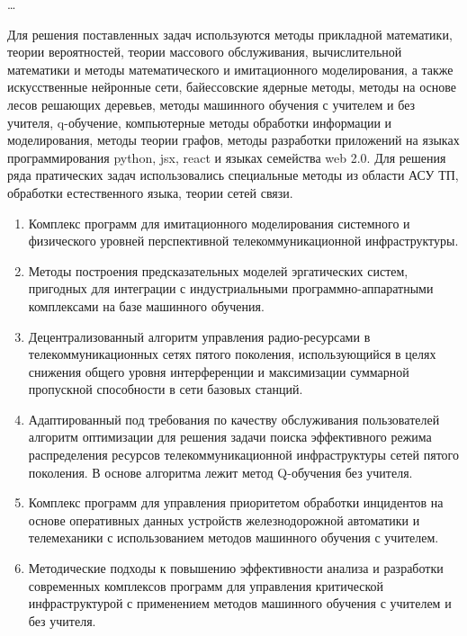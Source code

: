 {\influence} \ldots

{\methods} Для решения поставленных задач используются методы прикладной математики, теории вероятностей, теории массового обслуживания, вычислительной математики и методы математического и имитационного моделирования, а также искусственные нейронные сети, байессовские ядерные методы, методы на основе лесов решающих деревьев, методы машинного обучения  с учителем и без учителя, q-обучение, компьютерные методы обработки информации и моделирования, методы теории графов, методы разработки приложений на языках программирования python, jsx, react и языках семейства web 2.0. Для решения ряда пратических задач использовались  специальные методы из области АСУ ТП, обработки естественного языка, теории сетей связи.


{}
\begin{enumerate}
  \item Комплекс программ для имитационного моделирования системного и физического уровней перспективной телекоммуникационной инфраструктуры.
  \item Методы построения предсказательных моделей эргатических систем, пригодных для интеграции с индустриальными программно-аппаратными комплексами на базе машинного обучения.
  \item Децентрализованный алгоритм управления радио-ресурсами в телекоммуникационных сетях пятого поколения, использующийся в целях снижения общего уровня интерференции и максимизации суммарной пропускной способности в сети базовых станций.
  \item Адаптированный под требования по качеству обслуживания пользователей алгоритм оптимизации для решения задачи поиска эффективного режима распределения ресурсов телекоммуникационной инфраструктуры сетей пятого поколения. В основе алгоритма лежит метод Q-обучения без учителя.
  \item Комплекс программ для управления приоритетом обработки инцидентов на основе оперативных данных устройств железнодорожной автоматики и телемеханики с использованием методов машинного обучения с учителем.
  \item Методические подходы к повышению эффективности анализа и разработки современных комплексов программ для управления критической инфраструктурой с применением методов машинного обучения с учителем и без учителя.
\end{enumerate}

